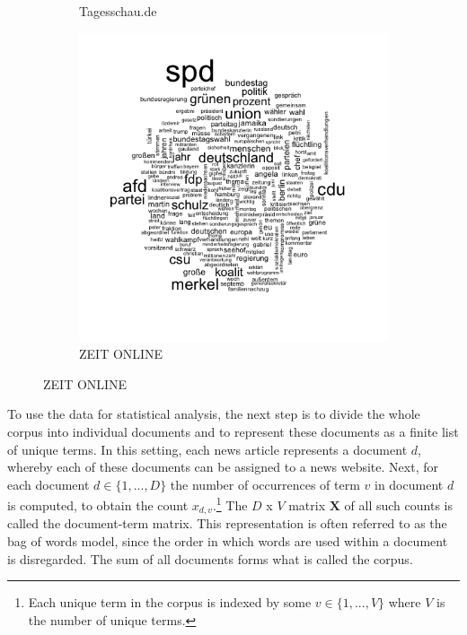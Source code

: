 \documentclass[12pt,a4paper,notitlepage]{article}
\begin{document}
\begin{figure}[H]
\begin{center}
\begin{subfigure}[normla]{0.3\textwidth}
			\caption{Tagesschau.de}
		\end{subfigure}
		\begin{subfigure}[normla]{0.3\textwidth}
			\includegraphics[width=\textwidth]{../figs/wordcloud_ZEITONLINE.png}
			\caption{ZEIT ONLINE}
		\end{subfigure}
	\end{center}
\end{figure}

To use the data for statistical analysis, the next step is to divide the whole corpus into individual documents and to represent these documents as a finite list of unique terms. In this setting, each news article represents a document $d$, whereby each of these documents can be assigned to a news website. Next, for each document $d \in \lbrace 1,...,D \rbrace$ the number of occurrences of term $v$ in document $d$ is computed, to obtain the count $x_{d,v}$.\footnote{Each unique term in the corpus is indexed by some $v \in \lbrace 1,...,V \rbrace$ where $V$ is the number of unique terms.} The $D$ x $V$ matrix $\boldsymbol{X}$ of all such counts is called the document-term matrix. This representation is often referred to as the bag of words model, since the order in which words are used within a document is disregarded. The sum of all documents forms what is called the corpus. 
\end{document}
